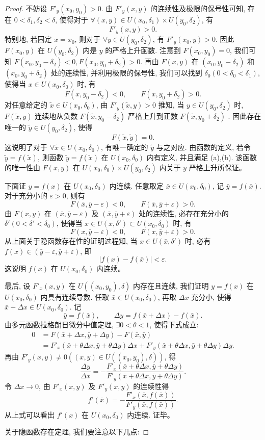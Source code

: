 \documentclass[12pt,fontset=fandol]{ctexart}
\begin{document}
\begin{proof}\quad 不妨设 $F'_y(x_0,y_0)>0$. 由 $F'_y(x,y)$ 的连续性及极限的保号性可知, 存在 $0<\delta_1,\delta_2<\delta$, 使得对于 $\forall(x,y)\in U(x_0,\delta_1)\times U(y_0,\delta_2)$, 有
\[
  F'_y(x,y)>0.
\]
特别地, 若固定 $x=x_0$, 则对于 $\forall y\in U(y_0,\delta_2)$, 有 $F'_y(x_0,y)>0$. 因此 $F(x_0,y)$ 在 $U(y_0,\delta_2)$ 内是 $y$ 的严格上升函数. 注意到 $F(x_0,y_0)=0$, 我们可知 $F(x_0,y_0-\delta_2)<0,F(x_0,y_0+\delta_2)>0$. 再由 $F(x,y)$ 在 $(x_0,y_0-\delta_2)$ 和 $(x_0,y_0+\delta_2)$ 处的连续性, 并利用极限的保号性, 我们可以找到 $\delta_0(0<\delta_0<\delta_1)$, 使得当 $x\in U(x_0,\delta_0)$ 时, 有
\[
  F(x,y_0-\delta_2)<0,\qquad F(x,y_0+\delta_2)>0.
\]
对任意给定的 $\tilde x\in U(x_0,\delta_0)$, 由 $F'_y(\tilde x,y)>0$ 推知, 当 $y\in U(y_0,\delta_2)$ 时, $F(\tilde x,y)$ 连续地从负数 $F(\tilde x,y_0-\delta_2)$ 严格上升到正数 $F(\tilde x,y_0+\delta_2)$ . 因此存在唯一的 $\tilde y\in U(y_0,\delta_2)$, 使得
\[
  F(\tilde x,\tilde y)=0.
\]
这说明了对于 $\forall\tilde x\in U(x_0,\delta_0)$, 有唯一确定的 $\tilde y$ 与之对应. 由函数的定义, 若令 $\tilde y=f(\tilde x)$, 则函数 $\tilde y=f(\tilde x)$ 在 $U(x_0,\delta_0)$ 内有定义, 并且满足 (a),(b). 该函数的唯一性由 $F(x,y)$ 在 $U(x_0,\delta_0)\times U(y_0,\delta_2)$ 内关于 $y$ 严格上升所保证。

下面证 $y=f(x)$ 在 $U(x_0,\delta_0)$ 内连续. 任意取定 $\bar x\in U(x_0,\delta_0)$, 记 $\bar y=f(\bar x)$. 对于充分小的 $\varepsilon>0$, 则有
\[
  F(\bar x,\bar y-\varepsilon)<0,\qquad F(\bar x,\bar y+\varepsilon)>0.
\]
由 $F(x,y)$ 在 $(\bar x,\bar y-\varepsilon)$ 及 $(\bar x,\bar y+\varepsilon)$ 处的连续性, 必存在充分小的 $\delta'(0<\delta'<\delta_0)$, 使得当 $x\in U(\bar x,\delta')\subset U(x_0,\delta_0)$ 时, 有
\[
  F(x,\bar y-\varepsilon)<0,\qquad F(x,\bar y+\varepsilon)>0.
\]
从上面关于隐函数存在性的证明过程知, 当 $x\in U(\bar x,\delta')$ 时, 必有 $f(x)\in(\bar y-\varepsilon,\bar y+\varepsilon)$, 即
\[
  |f(x)-f(\bar x)|<\varepsilon.
\]
这说明 $f(x)$ 在 $U(x_0,\delta_0)$ 内连续。

最后, 设 $F'_x(x,y)$ 在 $U((x_0,y_0),\delta)$ 内存在且连续, 我们证明 $y=f(x)$ 在 $U(x_0,\delta_0)$ 内具有连续导数. 任取 $\bar x\in U(x_0,\delta_0)$, 再取 $\Delta x$ 充分小, 使得 $\bar x+\Delta x\in U(x_0,\delta_0)$. 记
\[
  \bar y=f(\bar x),\qquad
  \Delta y=f(\bar x+\Delta x)-f(\bar x).
\]
由多元函数拉格朗日微分中值定理, $\exists0<\theta<1$, 使得下式成立:
\[
\begin{aligned}
  0&=F(\bar x+\Delta x,\bar y+\Delta y)-F(\bar x,\bar y)\\
  &=F'_x(\bar x+\theta\Delta x,\bar y+\theta\Delta y)\Delta x
  +F'_y(\bar x+\theta\Delta x,\bar y+\theta\Delta y)\Delta y.
\end{aligned}
\]
再由 $F'_y(x,y)\ne0((x,y)\in U((x_0,y_0),\delta))$, 得
\[
  \frac{\Delta y}{\Delta x}
  =-\frac{F'_x(\bar x+\theta\Delta x,\bar y+\theta\Delta y)}
  {F'_y(\bar x+\theta\Delta x,\bar y+\theta\Delta y)}.
\]
令 $\Delta x\to0$, 由 $F'_x(x,y)$ 及 $F'_y(x,y)$ 的连续性得
\[
  f'(\bar x)=-\frac{F'_x(\bar x,f(\bar x))}{F'_y(\bar x,f(\bar x))}.
\]
从上式可以看出 $f'(x)$ 在 $U(x_0,\delta_0)$ 内连续. 证毕。

关于隐函数存在定理, 我们要注意以下几点:

\end{proof}
\end{document}
